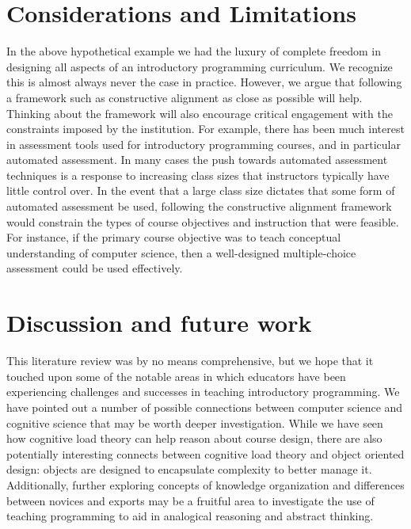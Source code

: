 \documentclass[12pt]{article}
\begin{document}
\section{Considerations and Limitations}
In the above hypothetical example we had the luxury of complete
freedom in designing all aspects of an introductory programming
curriculum. We recognize this is almost always never the case in
practice. However, we argue that following a framework such as
constructive alignment as close as possible will help. Thinking about
the framework will also encourage critical engagement with the
constraints imposed by the institution. For example, there has been
much interest in assessment tools used for introductory programming
courses\autocite{lister_blooming_2000,lister_objectives_2001,sheard_exploring_2011},
and in particular automated
assessment\autocite{cheang_automated_2003,traynor_synthesis_2005,ihantola_review_2010}. In
many cases the push towards automated assessment techniques is a
response to increasing class sizes that instructors typically have
little control over. In the event that a large class size dictates
that some form of automated assessment be used, following the
constructive alignment framework would constrain the types of course
objectives and instruction that were feasible. For instance, if the
primary course objective was to teach conceptual understanding of
computer science, then a well-designed multiple-choice assessment
could be used
effectively\autocite{lister_blooming_2000,lister_objectives_2001}.

\section{Discussion and future work}

This literature review was by no means comprehensive, but we hope that
it touched upon some of the notable areas in which educators have been
experiencing challenges and successes in teaching introductory
programming. We have pointed out a number of possible connections
between computer science and cognitive science that may be worth
deeper investigation. While we have seen how cognitive load theory can
help reason about course design, there are also potentially
interesting connects between cognitive load theory and object oriented
design: objects are designed to encapsulate complexity to better
manage it. Additionally, further exploring concepts of knowledge
organization and differences between novices and exports may be a
fruitful area to investigate the use of teaching programming to aid in
analogical reasoning and abstract
thinking\autocite{bennedssen_abstraction_2008}.
\end{document}
